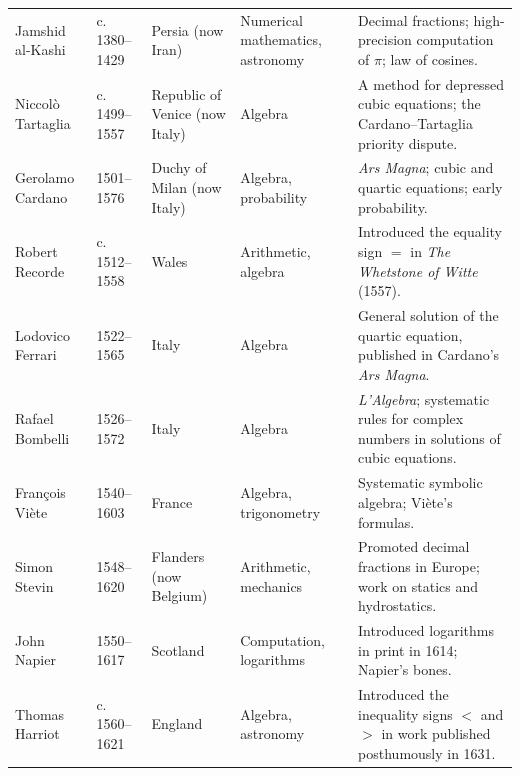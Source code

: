 {\begin{longtable}{@{}L{0.145\textwidth}L{0.09\textwidth}L{0.225\textwidth}L{0.14\textwidth}L{0.30\textwidth}@{}}
        Jamshid al-Kashi
        & c. 1380--1429
        & Persia (now Iran)
        & Numerical mathematics, astronomy
        & Decimal fractions; high-precision computation of $\pi$; law of
          cosines. \\

        Niccolò Tartaglia
        & c. 1499--1557
        & Republic of Venice (now Italy)
        & Algebra
        & A method for depressed cubic equations; the Cardano--Tartaglia
          priority dispute. \\

        Gerolamo Cardano
        & 1501--1576
        & Duchy of Milan (now Italy)
        & Algebra, probability
        & \textit{Ars Magna}; cubic and quartic equations; early probability. \\

        Robert Recorde
        & c. 1512--1558
        & Wales
        & Arithmetic, algebra
        & Introduced the equality sign $=$ in
          \textit{The Whetstone of Witte} (1557). \\

        Lodovico Ferrari
        & 1522--1565
        & Italy
        & Algebra
        & General solution of the quartic equation, published in Cardano's
          \textit{Ars Magna}. \\

        Rafael Bombelli
        & 1526--1572
        & Italy
        & Algebra
        & \textit{L'Algebra}; systematic rules for complex numbers in solutions
          of cubic equations. \\

        François Viète
        & 1540--1603
        & France
        & Algebra, trigonometry
        & Systematic symbolic algebra; Viète's formulas. \\

        Simon Stevin
        & 1548--1620
        & Flanders (now Belgium)
        & Arithmetic, mechanics
        & Promoted decimal fractions in Europe; work on statics and hydrostatics. \\

        John Napier
        & 1550--1617
        & Scotland
        & Computation, logarithms
        & Introduced logarithms in print in 1614; Napier's bones. \\

        Thomas Harriot
        & c. 1560--1621
        & England
        & Algebra, astronomy
        & Introduced the inequality signs $<$ and $>$ in work published
          posthumously in 1631. \\


\end{longtable}}
